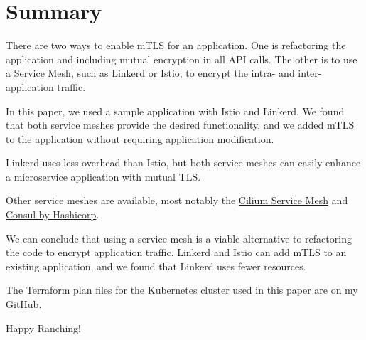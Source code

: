 %
%

\pagebreak
\section{Summary}

\onehalfspacing

There are two ways to enable mTLS for an application. One is refactoring the application and including mutual encryption in all API calls. The other is to use a Service Mesh, such as Linkerd or Istio, to encrypt the intra- and inter-application traffic.

In this paper, we used a sample application with Istio and Linkerd. We found that both service meshes provide the desired functionality, and we added mTLS to the application without requiring application modification.

Linkerd uses less overhead than Istio, but both service meshes can easily enhance a microservice application with mutual TLS. 

Other service meshes are available, most notably the \href{https://cilium.io/use-cases/service-mesh/}{Cilium Service Mesh} and \href{https://www.consul.io/}{Consul by Hashicorp}.

We can conclude that using a service mesh is a viable alternative to refactoring the code to encrypt application traffic. Linkerd and Istio can add mTLS to an existing application, and we found that Linkerd uses fewer resources.

The Terraform plan files for the Kubernetes cluster used in this paper are on my \href{https://github.com/chfrank-cgn/Rancher/tree/master/aks-cluster}{GitHub}.

Happy Ranching!
